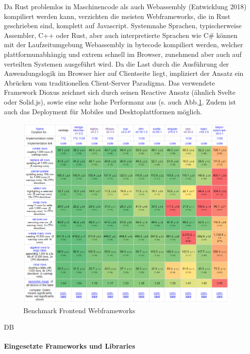\documentclass[notitlepage, hidelinks]{article}
\begin{document}
Da Rust problemlos in Maschinencode als auch Webassembly (Entwicklung 2018) kompiliert werden kann, verzichten die meisten Webframeworks, die in Rust geschrieben sind, komplett auf Javascript. Systemnahe Sprachen, typischerweise Assembler, C++ oder Rust, aber auch interpretierte Sprachen wie C\# können mit der Laufzeitumgebung Webassembly in bytecode kompiliert werden, welcher plattformunabhängig und extrem schnell im Browser, zunehmend aber auch auf verteilten Systemen ausgeführt wird. Da die Last durch die Ausführung der Anwendungslogik im Browser hier auf Clientseite liegt, impliziert der Ansatz ein Abrücken vom traditionellen Client-Server Paradigma. Das verwendete Framework Dioxus zeichnet sich durch seinen Reactive Ansatz (ähnlich Svelte oder Solid.js), sowie eine sehr hohe Performanz aus (s. auch Abb.\ref{fig:clientbenchmark}. Zudem ist auch das Deployment für Mobiles und Desktoplattformen möglich.

\begin{figure}[H]
\centering
  \includegraphics[width=\textwidth]{images/bm.png}
  \caption{Benchmark Frontend Webframeworks}
  \label{fig:clientbenchmark}
\end{figure}


DB

\paragraph{Eingesetzte Frameworks und Libraries} \mbox{} \\
\end{document}
